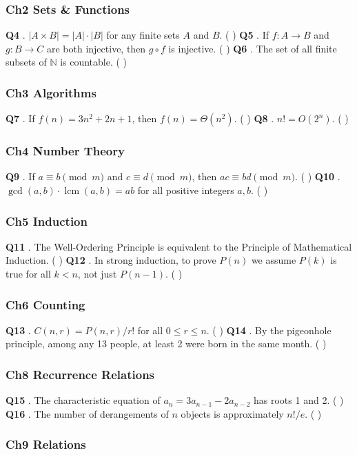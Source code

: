 \documentclass[10pt,a4paper,openany]{ctexbook}
\theoremstyle{definition}
\theoremstyle{remark}
\begin{document}
\subsubsection{Ch2 Sets \& Functions}

\textbf{Q4} . $|A \times B| = |A| \cdot |B|$ for any finite sets $A$ and $B$. ( )
\textbf{Q5} . If $f: A \to B$ and $g: B \to C$ are both injective, then $g \circ f$ is injective. ( )
\textbf{Q6} . The set of all finite subsets of $\mathbb{N}$ is countable. ( )
\subsubsection{Ch3 Algorithms}

\textbf{Q7} . If $f(n) = 3n^2 + 2n + 1$, then $f(n) = \Theta(n^2)$. ( )
\textbf{Q8} . $n! = O(2^n)$. ( )
\subsubsection{Ch4 Number Theory}

\textbf{Q9} . If $a \equiv b \pmod{m}$ and $c \equiv d \pmod{m}$, then $ac \equiv bd \pmod{m}$. ( )
\textbf{Q10} . $\gcd(a, b) \cdot \operatorname{lcm}(a, b) = ab$ for all positive integers $a, b$. ( )
\subsubsection{Ch5 Induction}

\textbf{Q11} . The Well-Ordering Principle is equivalent to the Principle of Mathematical Induction. ( )
\textbf{Q12} . In strong induction, to prove $P(n)$ we assume $P(k)$ is true for all $k < n$, not just $P(n-1)$. ( )
\subsubsection{Ch6 Counting}

\textbf{Q13} . $C(n, r) = P(n, r) / r!$ for all $0 \le r \le n$. ( )
\textbf{Q14} . By the pigeonhole principle, among any 13 people, at least 2 were born in the same month. ( )
\subsubsection{Ch8 Recurrence Relations}

\textbf{Q15} . The characteristic equation of $a_n = 3a_{n-1} - 2a_{n-2}$ has roots 1 and 2. ( )
\textbf{Q16} . The number of derangements of $n$ objects is approximately $n!/e$. ( )
\subsubsection{Ch9 Relations}
\end{document}
